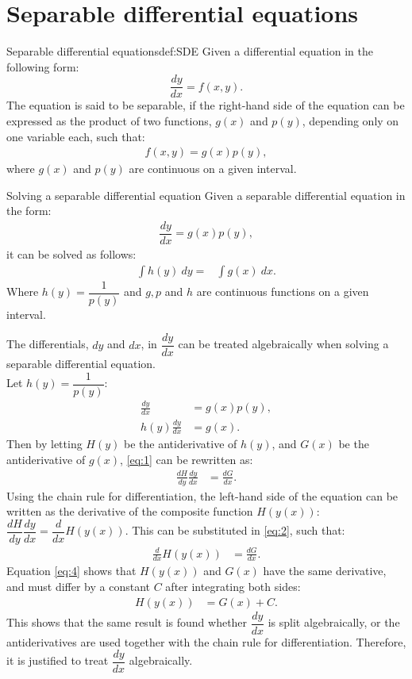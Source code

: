 \section{Separable differential equations}\label{SepDiff}
\begin{definition}{Separable differential equations}{def:SDE}
Given a differential equation in the following form: 
$$\frac{dy}{dx} = f(x,y).$$
The equation is said to be separable, if the right-hand side of the equation can be expressed as the product of two functions, $g(x)$ and $p(y)$, depending only on one variable each, such that:
\begin{align*}
f(x,y)=g(x)p(y),
\end{align*}
where $g(x)$ and $p(y)$ are continuous on a given interval.
\end{definition}
\noindent
\begin{theorem}{Solving a separable differential equation}{}
Given a separable differential equation in the form:
\begin{align}
\dfrac{dy}{dx}=g(x)p(y), \label{SDEG}
\end{align}
it can be solved as follows:
\begin{align*}
\int h(y)\ dy =&\int g(x)\ dx.
\end{align*}
Where $h(y)=\dfrac{1}{p(y)}$ and $g, p$ and $h$ are continuous functions on a given interval.
\end{theorem}
\begin{justification}{}{}
The differentials, $dy$ and $dx$, in $\dfrac{dy}{dx}$ can be treated algebraically when solving a separable differential equation. 
\\
Let $h(y) = \dfrac{1}{p(y)}$:
 \begin{align}
	\frac{dy}{dx} &= g(x)p(y), \nonumber\\
	h(y)\frac{dy}{dx} &= g(x). \label{eq:1}
 \end{align}
Then by letting $H(y)$ be the antiderivative of $h(y)$, and $G(x)$ be the antiderivative of $g(x)$, \eqref{eq:1} can be rewritten as: 
 \begin{align}
 	\frac{dH}{dy}\frac{dy}{dx} &= \frac{dG}{dx}. \label{eq:2}
 \end{align}
Using the chain rule for differentiation, the left-hand side of the equation can be written as the derivative of the composite function $H \left(y(x) \right)$: $\dfrac{dH}{dy}\dfrac{dy}{dx} =\dfrac{d}{dx} H \left(y(x) \right).$ This can be substituted in \eqref{eq:2}, such that:
 \begin{align}
 	\frac{d}{dx}H\left(y(x)\right) &= \frac{dG}{dx}\label{eq:4}.
 \end{align}
Equation \eqref{eq:4} shows that $H\left(y(x)\right)$ and $G(x)$ have the same derivative, and must differ by a constant $C$ after integrating both sides:
 \begin{align*}
 	H\left(y(x)\right) &= G(x) + C.
 \end{align*}
This shows that the same result is found whether $\dfrac{dy}{dx}$ is split algebraically, or the antiderivatives are used together with the chain rule for differentiation. Therefore, it is justified to treat $\dfrac{dy}{dx}$ algebraically.
\end{justification}

